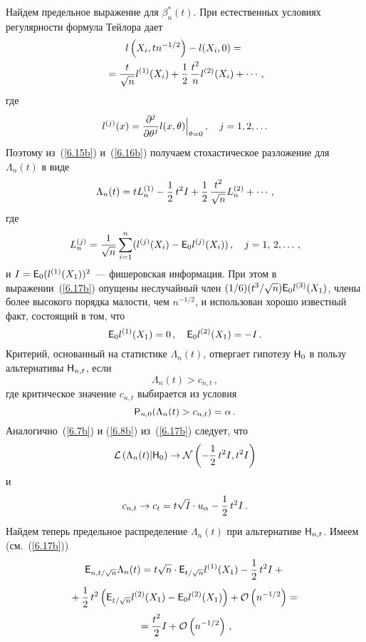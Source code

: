 \begin{multicols}{2}
Найдем предельное выражение для $\beta_n^*(t)$. При естественных
условиях регулярности формула Тейлора дает
\begin{multline}
l\left (X_i,tn^{-1/2}\right )-l(X_i,0) = {}\\
{}=
\displaystyle\frac{\displaystyle t\mathstrut}{\displaystyle \sqrt{n}\mathstrut}l^{(1)}(X_i)+\displaystyle\frac{\displaystyle 1\mathstrut}{\displaystyle 2\mathstrut}\,\displaystyle\frac{\displaystyle t^2\mathstrut}{\displaystyle n\mathstrut}l^{(2)}(X_i)+\cdots
\,,
\label{6.16b}
\end{multline}
где
$$
l^{(j)}(x) = \displaystyle\frac{\displaystyle \partial^j\mathstrut}{\displaystyle \partial\theta^j\mathstrut}l(x,\theta)\Bigr|_{\theta =
0}\,,\quad j = 1, 2, \ldots
$$
Поэтому из~(\ref{6.15b}) и~(\ref{6.16b}) получаем
стохастическое разложение для $\Lambda_n(t)$ в виде
\begin{equation}
\Lambda_n(t) = tL_n^{(1)} - \displaystyle\frac{\displaystyle 1\mathstrut}{\displaystyle 2\mathstrut}\,t^2I +
\displaystyle\frac{\displaystyle 1\mathstrut}{\displaystyle 2\mathstrut}\,\displaystyle\frac{\displaystyle t^2\mathstrut}{\displaystyle \sqrt{n}\mathstrut}L_n^{(2)} + \cdots\,, \label{6.17b}
\end{equation}
где
$$
L_n^{(j)} = \displaystyle\frac{\displaystyle 1\mathstrut}{\displaystyle \sqrt{n}\mathstrut}\sum_{i=1}^{n}(l^{(j)}(X_i)-{{\sf E}}_{0}l^{(j)}(X_i))\,,\quad
 j = 1,\,2, \ldots \,,
$$
и $ I = {{\sf E}}_{0}(l^{(1)}(X_1))^2$~--- фишеровская информация. При этом в
выражении~(\ref{6.17b}) опущены неслучайный член
$(1/6)(t^3/\sqrt{n}){{\sf E}}_0l^{(3)}(X_1)$, члены более
высокого порядка малости, чем $n^{-1/2}$, и использован хорошо
известный факт, состоящий в том, что
\begin{equation*}
{{\sf E}}_0l^{(1)}(X_1) = 0\,,\quad
{{\sf E}}_0l^{(2)}(X_1) = -I\,.
\end{equation*}
Критерий, основанный на статистике $\Lambda_n(t)$, отвергает гипотезу
${\sf H}_0$ в пользу альтернативы ${\sf H}_{n,t}$, если
\begin{equation*}
\Lambda_n(t) > c_{n,t}\,,
\end{equation*}
где критическое значение $c_{n,t}$ выбирается из условия
\begin{equation*}
{{\sf P}}_{n,0}(\Lambda_n(t) > c_{n,t}) = \alpha\,.
\end{equation*}
Аналогично~(\ref{6.7b}) и (\ref{6.8b}) из~(\ref{6.17b}) следует, что
\begin{equation}
{\cal L}\left (\Lambda_n(t)|{\sf H}_0\right ) \to {\cal N}
\left (-\displaystyle\frac{\displaystyle 1\mathstrut}{\displaystyle 2\mathstrut}\,t^2I,t^2I\right )
\label{6.21b}
\end{equation}
и
\begin{equation}
c_{n,t}\to c_t =
 t\sqrt{I}\cdot u_{\alpha}  -\displaystyle\frac{\displaystyle 1\mathstrut}{\displaystyle 2\mathstrut}\,t^2I\,.
\label{6.22b}
\end{equation}
Найдем теперь предельное распределение $\Lambda_n(t)$ при альтернативе
${\sf H}_{n,t}$. Имеем (см.~(\ref{6.17b}))
\begin{multline*}
{{\sf E}}_{n,t/\sqrt{n}}\Lambda_n(t)=
t\sqrt{n}\cdot {{\sf E}}_{t/\sqrt{n}}l^{(1)}(X_1)- \displaystyle\frac{\displaystyle 1\mathstrut}{\displaystyle 2\mathstrut}\,t^2I+{}\\
{}
+\displaystyle\frac{\displaystyle 1\mathstrut}{\displaystyle 2\mathstrut}\,t^2\left (
{{\sf E}}_{t/\sqrt{n}}l^{(2)}(X_1)-{{\sf E}}_0l^{(2)}(X_1)\right ) +
{\cal O}\left (n^{-1/2}\right )={}\\
{}=\displaystyle\frac{\displaystyle t^2\mathstrut}{\displaystyle 2\mathstrut}I + {\cal
O}\left (n^{-1/2}\right )\,,
\end{multline*}


\end{multicols}
